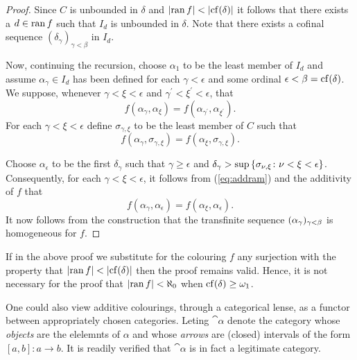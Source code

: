 \begin{proof}
	Since $C$ is unbounded in $\delta$ and $\left\lvert\operatorname{ran} f\right\rvert<\left\lvert\operatorname{cf}(\delta)\right\rvert$
	it follows that there exists a $d\in\operatorname{ran} f$ such that $I_d$ is unbounded
	in $\delta$.  Note that there exists a cofinal sequence
	$(\delta_\gamma)_{\gamma<\beta}$ in $I_d$.

	Now, continuing the recursion, choose $\alpha_1$ to be the least member of
	$I_d$ and assume $\alpha_\gamma\in I_d$ has been defined for each
	$\gamma<\epsilon$ and some ordinal $\epsilon<\beta=\operatorname{cf}(\delta)$.  We
	suppose, whenever $\gamma<\xi<\epsilon$ and
	$\gamma^\prime<\xi^\prime<\epsilon$, that
	\begin{equation}
		f(\alpha_\gamma,\alpha_\xi)=f(\alpha_{\gamma^\prime},\alpha_{\xi^\prime}).
	\end{equation}
	For each $\gamma<\xi<\epsilon$ define $\sigma_{\gamma,\xi}$ to be the least
	member of $C$ such that
	\begin{equation}\label{eq:addram}
		f(\alpha_\gamma,\sigma_{\gamma,\xi})=f(\alpha_\xi,\sigma_{\gamma,\xi}).
	\end{equation}

	Choose $\alpha_\epsilon$ to be the first $\delta_\gamma$ such that
	$\gamma\geq\epsilon$ and
	$\delta_\gamma>\sup\left\lbrace \sigma_{\nu,\xi}\colon \nu<\xi<\epsilon \right\rbrace$.
	Consequently, for each $\gamma<\xi<\epsilon$, it follows from
	(\ref{eq:addram}) and the additivity of $f$ that
	\begin{equation}
		f(\alpha_\gamma,\alpha_\epsilon)=f(\alpha_\xi,\alpha_\epsilon).
	\end{equation}
	It now follows from the construction that the transfinite sequence
	$(\alpha_\gamma)_{\gamma<\beta}$ is homogeneous for $f$.
\end{proof}

\begin{rem}
	If in the above proof we substitute for the colouring $f$ any surjection
	with the property that $\left\lvert\operatorname{ran} f\right\rvert<\left\lvert\operatorname{cf}(\delta)\right\rvert$ then the proof
	remains valid.  Hence, it is not necessary for the proof that $\left\lvert\operatorname{ran}
	f\right\rvert<\aleph_0$ when $\operatorname{cf}(\delta)\geq\omega_1$.
\end{rem}

One could also view additive colourings, through a categorical lense, as a
functor between appropriately chosen categories.  Leting $\cat{\alpha}$ denote
the category whose \textit{objects} are the elelemnts of $\alpha$ and whose
\textit{arrows} are (closed) intervals of the form $[a,b]\colon a\to b$.  It is
readily verified that $\cat{\alpha}$ is in fact a legitimate category.

